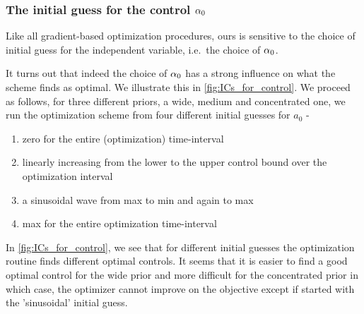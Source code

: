 \subsubsection{The initial guess for the control $\alpha_0$}
Like all gradient-based optimization procedures, ours is sensitive to the choice
of initial guess for the independent variable, i.e.\ the choice of $\alpha_0$. 

It turns out that indeed the choice of $\alpha_0$ has a strong influence on what the
scheme finds as optimal. We illustrate this in \cref{fig:ICs_for_control}. We
proceed as follows, for three different priors, a wide, medium and concentrated
one, we run the optimization scheme from four different initial guesses for
$a_0$ - 
\begin{enumerate}
\item zero for the entire (optimization) time-interval
\item linearly increasing from the lower to the upper control bound over the
optimization interval
\item a sinusoidal wave from max to min and again to max
\item max for the entire optimization time-interval 
\end{enumerate}
In \cref{fig:ICs_for_control}, we see that for different initial guesses the
optimization routine finds different optimal controls. It seems that it is
easier to find a good optimal control for the wide prior and more difficult for
the concentrated prior in which case, the optimizer cannot improve on the
objective except if started with the 'sinusoidal' initial guess.

